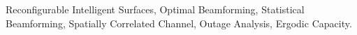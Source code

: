 \documentclass[journal,draftclsnofoot,onecolumn,12pt]{IEEEtran}
\begin{document}
\begin{abstract}
\end{abstract}
\vspace{-0.4cm}
\begin{IEEEkeywords}
\vspace{-0.2cm}
Reconfigurable Intelligent Surfaces, Optimal Beamforming, Statistical Beamforming, Spatially Correlated Channel, Outage Analysis, Ergodic Capacity.
\end{IEEEkeywords}
%
\IEEEpeerreviewmaketitle
\end{document}
